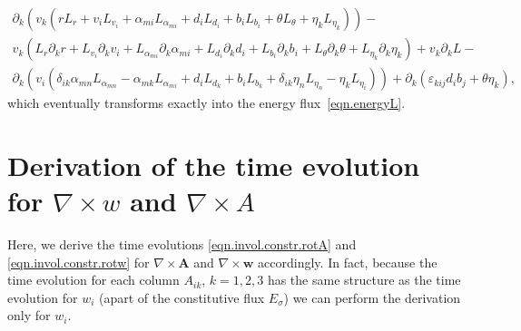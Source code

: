 \documentclass[twoside]{article}
\newcommand{\AAA}{{\boldsymbol{A}}}
\newcommand{\ww}{{\boldsymbol{w}}}
\newcommand{\ted}{E} %
\newcommand{\pd}{\partial}
\newcommand{\eps}{\varepsilon}
\begin{document}
\begin{gather}\label{eqn.appB.eq4}
\pd_k\left(v_k(r L_r + v_i L_{v_i} + \alpha_{mi}L_{\alpha_{mi}} + d_i L_{d_i} + 
b_i L_{b_i} + \theta L_\theta + \eta_k L_{\eta_k})\right) - \nonumber\\[1mm]
%
v_k\left(L_r\pd_k r + L_{v_i}\pd_k v_i + L_{\alpha_{mi}}\pd_k \alpha_{mi} +  
L_{d_i} \pd_k d_i + L_{b_i} \pd_k b_i  + L_\theta \pd_k \theta + L_{\eta_k}
\pd_k \eta_k \right) + v_k\pd_k L - \nonumber\\[1mm]
%
\pd_k \left(v_i (\delta_{ik}\alpha_{mn}L_{\alpha_{mn}} - 
\alpha_{mk}L_{\alpha_{mi}} + d_i L_{d_k} + b_i L_{b_k} + \delta_{ik} \eta_n 
L_{\eta_n} - \eta_k L_{\eta_i}) \right) + \pd_k (\eps_{kij}d_i b_j + \theta 
\eta_k),
\end{gather}
which eventually transforms exactly into the energy flux~\eqref{eqn.energyL}.



\section{Derivation of the time evolution for $ \nabla\times w $ and $ 
\nabla\times A $}\label{app.evol.rotw}

Here, we derive the time evolutions \eqref{eqn.invol.constr.rotA} 
and 
\eqref{eqn.invol.constr.rotw} for $ \nabla\times\AAA $ and $ \nabla\times\ww $ 
accordingly. In fact, because the time evolution for each column $ A_{ik} $, $ 
k=1,2,3 $ has the same structure as the time evolution for $ w_i $ (apart of 
the constitutive flux $ \ted_\sigma $) we can perform the derivation only for $ 
w_i $.
\end{document}
